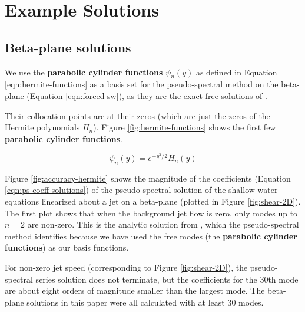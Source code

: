 \section{Example Solutions}


\subsection*{Beta-plane solutions}\label{sec:app-beta}

We use the \textbf{parabolic cylinder functions} $\psi_{n}(y)$ \citep{showman2011superrotation} as defined in Equation \ref{eqn:hermite-functions} as a basis set for the pseudo-spectral method on the beta-plane (Equation \ref{eqn:forced-sw}), as they are the exact free solutions of \citet{matsuno1966quasi} \citep{boyd2000spectral}.

Their collocation points are at their zeros (which are just the zeros of the Hermite polynomials $H_{n}$). Figure \ref{fig:hermite-functions} shows the first few \textbf{parabolic cylinder functions}.

\begin{equation}\label{eqn:hermite-functions}
  \psi_{n}(y) = e^{-y^{2} / 2} H_{n}(y)
\end{equation}

Figure \ref{fig:accuracy-hermite} shows the magnitude of the coefficients (Equation \ref{eqn:ps-coeff-solutions}) of the pseudo-spectral solution of the shallow-water equations linearized about a jet on a beta-plane (plotted in Figure \ref{fig:shear-2D}). The first plot shows that when the background jet flow is zero, only modes up to $n=2$ are non-zero. This is the analytic solution from \citet{matsuno1966quasi}, which the pseudo-spectral method identifies because we have used the free modes (the \textbf{parabolic cylinder functions}) as our basis functions.

For non-zero jet speed (corresponding to Figure \ref{fig:shear-2D}), the pseudo-spectral series solution does not terminate, but the coefficients for the 30th mode are about eight orders of magnitude smaller than the largest mode. The beta-plane solutions in this paper were all calculated with at least 30 modes.

